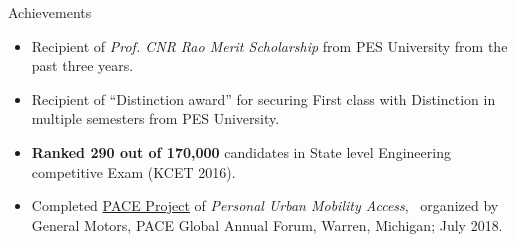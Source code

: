 \documentclass{CV} %
\begin{document}
\begin{rSection}{Achievements}

  \begin{itemize}

  \item Recipient of \textit{Prof. CNR Rao Merit Scholarship} from PES University from the past three years.

  \item Recipient of ``Distinction award'' for securing First class with Distinction in multiple semesters from PES University.
    
  \item \textbf{Ranked 290 out of 170,000} candidates in State level Engineering competitive Exam (KCET 2016).

  \item Completed \href{https://youtu.be/khK5RrpkqZM}{PACE Project} of \textit{Personal Urban Mobility Access}, \
    organized by General Motors, PACE Global Annual Forum, Warren, Michigan; July 2018.
    
  \end{itemize}
  
\end{rSection}




\end{document}
